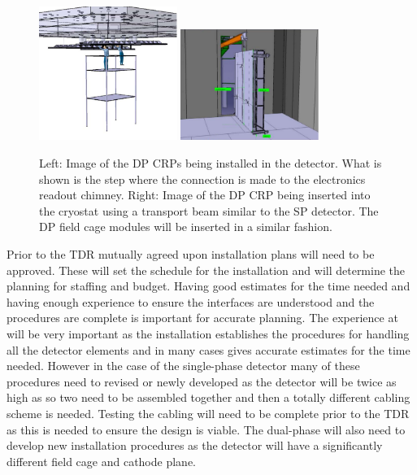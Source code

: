 \begin{figure}[htbp]
\begin{center}
\includegraphics[width=0.4\textwidth]{far-detector-single-phase/figures/CRP-install.pdf}
\includegraphics[width=0.4\textwidth]{far-detector-single-phase/figures/CRP-into-cryostat.pdf}
\caption{Left: Image of the DP CRPs being installed in the
  detector. What is shown is the step where the connection is made to
  the electronics readout chimney. Right: Image of the DP CRP being
  inserted into the cryostat using a transport beam similar to the SP
  detector. The DP field cage modules will be inserted in a similar
  fashion.}
\label{fig:CRP-Install}
\end{center}
\end{figure}



Prior to the TDR mutually agreed upon installation plans will need to
be approved. These will set the schedule for the installation and will
determine the planning for staffing and budget. Having good estimates
for the time needed and having enough experience to ensure the
interfaces are understood and the procedures are complete is important
for accurate planning. The experience at  will be
very important as the  installation establishes the
procedures for handling all the detector elements and in many cases
gives accurate estimates for the time needed. However in the case of
the single-phase detector many of these procedures need to revised or
newly developed as the  detector will be twice as high as
 so two  need to be assembled together
and then a totally different cabling scheme is needed. Testing the
cabling will need to be complete prior to the TDR as this is needed to
ensure the design is viable. The dual-phase will also need to develop
new installation procedures as the   detector
will have a significantly different field cage and cathode plane. 

